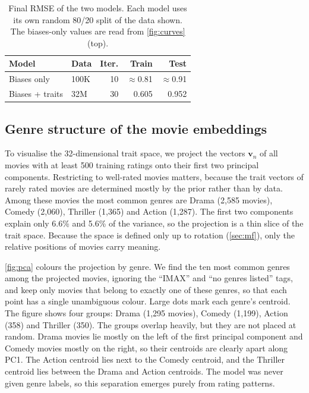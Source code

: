 \documentclass{article}
\theoremstyle{plain}
\theoremstyle{definition}
\theoremstyle{remark}
\begin{document}
\begin{table}[t]
\caption{Final RMSE of the two models. Each model uses its own random
80/20 split of the data shown. The biases-only values are read from
\cref{fig:curves} (top).}
\label{tab:rmse}
\vskip 0.15in
\begin{center}
\begin{small}
\begin{tabular}{llrrr}
\toprule
Model & Data & Iter. & Train & Test \\
\midrule
Biases only        & 100K & 10 & $\approx$0.81 & $\approx$0.91 \\
Biases + traits    & 32M  & 30 & 0.605 & 0.952 \\
\bottomrule
\end{tabular}
\end{small}
\end{center}
\vskip -0.1in
\end{table}

\subsection{Genre structure of the movie embeddings}
\label{sec:res-embed}

To visualise the 32-dimensional trait space, we project the vectors
$\mathbf{v}_n$ of all movies with at least 500 training ratings onto their
first two principal components. Restricting to well-rated movies matters,
because the trait vectors of rarely rated movies are determined mostly by
the prior rather than by data. Among these movies the most common genres
are Drama (2{,}585 movies), Comedy (2{,}060), Thriller
(1{,}365) and Action (1{,}287). The first two components explain only
6.6\% and 5.6\% of the variance, so the projection is a thin slice of the
trait space. Because the space is defined only up to rotation
(\cref{sec:mf}), only the relative positions of movies carry meaning.

\cref{fig:pca} colours the projection by genre. We find the ten most common
genres among the projected movies, ignoring the ``IMAX'' and ``no genres
listed'' tags, and keep only movies that belong to exactly one of these
genres, so that each point has a single unambiguous colour. Large dots mark each genre's
centroid. The figure shows four groups: Drama (1{,}295
movies), Comedy (1{,}199), Action (358) and Thriller (350). The groups
overlap heavily, but they are not placed at random. Drama movies lie mostly
on the left of the first principal component and Comedy movies mostly on
the right, so their centroids are clearly apart along PC1. The Action
centroid lies next to the Comedy centroid, and the Thriller centroid lies
between the Drama and Action centroids. The model was never given genre
labels, so this separation emerges purely from rating patterns.
\end{document}
